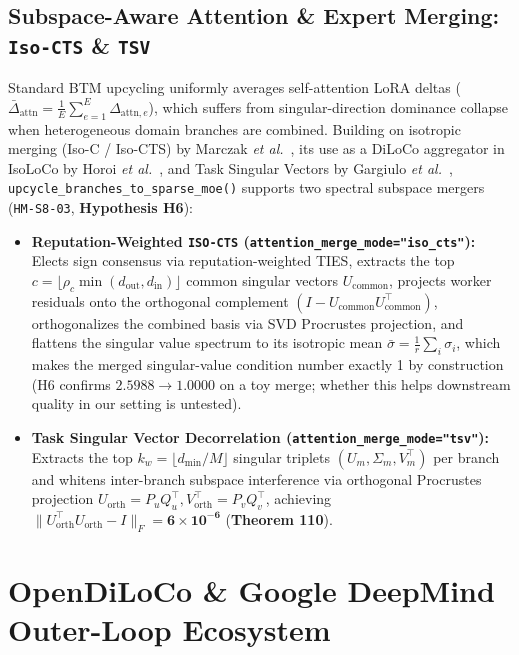\documentclass[11pt,a4paper]{article}
\begin{document}
\subsection{Subspace-Aware Attention \& Expert Merging: \texttt{Iso-CTS} \& \texttt{TSV}}

Standard BTM upcycling uniformly averages self-attention LoRA deltas ($\bar{\Delta}_{\text{attn}} = \frac{1}{E}\sum_{e=1}^E \Delta_{\text{attn}, e}$), which suffers from singular-direction dominance collapse when heterogeneous domain branches are combined. Building on isotropic merging (Iso-C / Iso-CTS) by Marczak \textit{et al.}\ \cite{marczak2025iso}, its use as a DiLoCo aggregator in IsoLoCo by Horoi \textit{et al.}\ \cite{horoi2026isoloco}, and Task Singular Vectors by Gargiulo \textit{et al.}\ \cite{gargiulo2024tsv}, \texttt{upcycle\_branches\_to\_sparse\_moe()} supports two spectral subspace mergers (\texttt{HM-S8-03}, \textbf{Hypothesis H6}):
\begin{itemize}[leftmargin=1.8em]
    \item \textbf{Reputation-Weighted \texttt{ISO-CTS} (\texttt{attention\_merge\_mode="iso\_cts"}):} Elects sign consensus via reputation-weighted TIES, extracts the top $c = \lfloor \rho_c \min(d_{\text{out}}, d_{\text{in}}) \rfloor$ common singular vectors $U_{\text{common}}$, projects worker residuals onto the orthogonal complement $(I - U_{\text{common}} U_{\text{common}}^\top)$, orthogonalizes the combined basis via SVD Procrustes projection, and flattens the singular value spectrum to its isotropic mean $\bar{\sigma} = \frac{1}{r}\sum_i \sigma_i$, which makes the merged singular-value condition number exactly 1 by construction (H6 confirms $2.5988 \to 1.0000$ on a toy merge; whether this helps downstream quality in our setting is untested).
    \item \textbf{Task Singular Vector Decorrelation (\texttt{attention\_merge\_mode="tsv"}):} Extracts the top $k_w = \lfloor d_{\min}/M \rfloor$ singular triplets $(U_m, \Sigma_m, V_m^\top)$ per branch and whitens inter-branch subspace interference via orthogonal Procrustes projection $U_{\text{orth}} = P_u Q_u^\top, V_{\text{orth}}^\top = P_v Q_v^\top$, achieving $\|U_{\text{orth}}^\top U_{\text{orth}} - I\|_F = \mathbf{6 \times 10^{-6}}$ (\textbf{Theorem 110}).
\end{itemize}

\section{OpenDiLoCo \& Google DeepMind Outer-Loop Ecosystem}
\label{sec:opendiloco}
\end{document}
